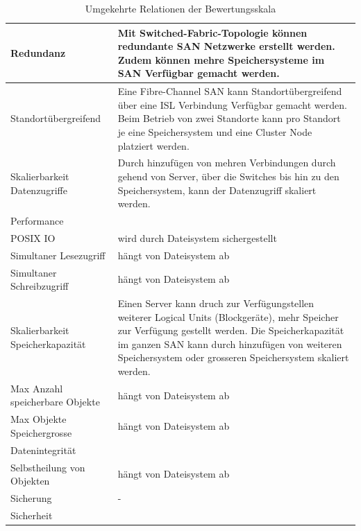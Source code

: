 \begin{table}[htbp]
\caption{Umgekehrte Relationen der Bewertungsskala}
\begin{tabular}{|L{3.5cm}|L{10cm}|}
\hline
Redundanz & Mit Switched-Fabric-Topologie können redundante SAN Netzwerke erstellt werden. Zudem können mehre Speichersysteme im SAN Verfügbar gemacht werden. \\ \hline
Standortübergreifend & Eine Fibre-Channel SAN kann Standortübergreifend über eine ISL Verbindung Verfügbar gemacht werden. Beim Betrieb von zwei Standorte kann pro Standort je eine Speichersystem und eine Cluster Node platziert werden. \\ \hline
Skalierbarkeit Datenzugriffe & Durch hinzufügen von mehren Verbindungen durch gehend von Server, über die Switches bis hin zu den Speichersystem, kann der Datenzugriff skaliert werden. \\ \hline
Performance &  \\ \hline
POSIX IO & wird durch Dateisystem sichergestellt \\ \hline
Simultaner Lesezugriff & hängt von Dateisystem ab \\ \hline
Simultaner Schreibzugriff & hängt von Dateisystem ab \\ \hline
Skalierbarkeit Speicherkapazität & Einen Server kann druch zur Verfügungstellen weiterer Logical Units (Blockgeräte), mehr Speicher zur Verfügung gestellt werden. Die Speicherkapazität im ganzen SAN kann durch hinzufügen von weiteren Speichersystem oder grosseren Speichersystem skaliert werden. \\ \hline
Max Anzahl speicherbare Objekte & hängt von Dateisystem ab \\ \hline
Max Objekte Speichergrosse & hängt von Dateisystem ab \\ \hline
Datenintegrität &  \\ \hline
Selbstheilung von Objekten & hängt von Dateisystem ab \\ \hline
Sicherung & - \\ \hline
Sicherheit &  \\ \hline
\end{tabular}
\label{UmgekehrteBewertungsskala}
\end{table}

